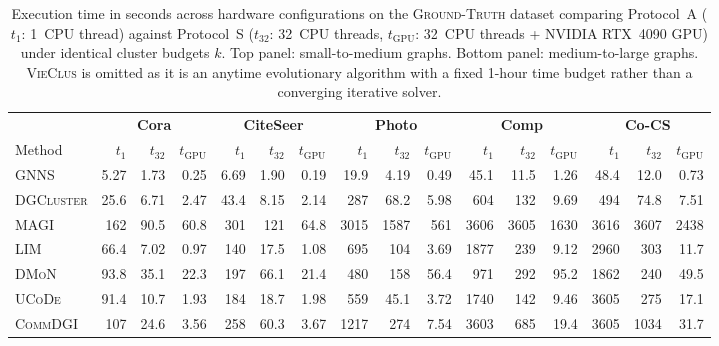 \documentclass[11pt,a4paper]{article}
\begin{document}
\begin{table}[H]
    \centering
    \caption{Execution time in seconds across hardware configurations on the \textsc{Ground-Truth} dataset comparing Protocol~A ($t_1$: 1~CPU thread) against Protocol~S ($t_{32}$: 32~CPU threads, $t_{\text{GPU}}$: 32~CPU threads + NVIDIA RTX~4090 GPU) under identical cluster budgets $k$. Top panel: small-to-medium graphs. Bottom panel: medium-to-large graphs. \textsc{VieClus} is omitted as it is an anytime evolutionary algorithm with a fixed 1-hour time budget rather than a converging iterative solver.}
    \label{tab:par-seq}
    \vspace{0.5em}
    \small
    \setlength{\tabcolsep}{2.0pt}
    \begin{tabular*}{\textwidth}{@{\extracolsep{\fill}}l rrr rrr rrr rrr rrr@{}}
        \toprule
        & \multicolumn{3}{c}{\textbf{Cora}} & \multicolumn{3}{c}{\textbf{CiteSeer}} & \multicolumn{3}{c}{\textbf{Photo}} & \multicolumn{3}{c}{\textbf{Comp}} & \multicolumn{3}{c}{\textbf{Co-CS}} \\
        \cmidrule(lr){2-4} \cmidrule(lr){5-7} \cmidrule(lr){8-10} \cmidrule(lr){11-13} \cmidrule(lr){14-16}
        Method & $t_1$ & $t_{32}$ & $t_{\text{GPU}}$ & $t_1$ & $t_{32}$ & $t_{\text{GPU}}$ & $t_1$ & $t_{32}$ & $t_{\text{GPU}}$ & $t_1$ & $t_{32}$ & $t_{\text{GPU}}$ & $t_1$ & $t_{32}$ & $t_{\text{GPU}}$ \\
        \midrule
        \textsc{GNNS}      & 5.27 & 1.73 & 0.25 & 6.69 & 1.90 & 0.19 & 19.9 & 4.19 & 0.49 & 45.1 & 11.5 & 1.26 & 48.4 & 12.0 & 0.73 \\
        \textsc{DGCluster} & 25.6 & 6.71 & 2.47 & 43.4 & 8.15 & 2.14 & 287  & 68.2 & 5.98 & 604  & 132  & 9.69 & 494  & 74.8 & 7.51 \\
        \textsc{MAGI}      & 162  & 90.5 & 60.8 & 301  & 121  & 64.8 & 3015 & 1587 & 561  & 3606 & 3605 & 1630 & 3616 & 3607 & 2438 \\
        \textsc{LIM}       & 66.4 & 7.02 & 0.97 & 140  & 17.5 & 1.08 & 695  & 104  & 3.69 & 1877 & 239  & 9.12 & 2960 & 303  & 11.7 \\
        \textsc{DMoN}      & 93.8 & 35.1 & 22.3 & 197  & 66.1 & 21.4 & 480  & 158  & 56.4 & 971  & 292  & 95.2 & 1862 & 240  & 49.5 \\
        \textsc{UCoDe}     & 91.4 & 10.7 & 1.93 & 184  & 18.7 & 1.98 & 559  & 45.1 & 3.72 & 1740 & 142  & 9.46 & 3605 & 275  & 17.1 \\
        \textsc{CommDGI}   & 107  & 24.6 & 3.56 & 258  & 60.3 & 3.67 & 1217 & 274  & 7.54 & 3603 & 685  & 19.4 & 3605 & 1034 & 31.7 \\
        \bottomrule
    \end{tabular*}


\end{table}
\end{document}
